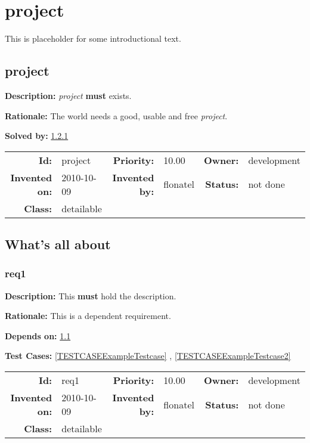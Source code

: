 \chapter{project}
This is placeholder for some introductional text.
\section{project}\label{project}
\textbf{Description:} \textsl{project} \textbf{must} exists.

\textbf{Rationale:} The world needs a good, usable and free \textsl{project}.

\textbf{Solved by:} \ref{req1} 

\par
{\small \begin{center}\begin{tabular}{rlrlrl}
\textbf{Id:} & project  & \textbf{Priority:} & 10.00  & \textbf{Owner:} & development\\ 
\textbf{Invented on:} & 2010-10-09  & \textbf{Invented by:} & flonatel  & \textbf{Status:} & not done \\ 
\textbf{Class:} & detailable  & & & \end{tabular}\end{center} }

\section{What's all about}
\subsection{req1}\label{req1}
\textbf{Description:} This \textbf{must} hold the description.

\textbf{Rationale:} This is a dependent requirement.

\textbf{Depends on:} \ref{project} 

\textbf{Test Cases:} \ref{TESTCASEExampleTestcase} , \ref{TESTCASEExampleTestcase2} 

\par
{\small \begin{center}\begin{tabular}{rlrlrl}
\textbf{Id:} & req1  & \textbf{Priority:} & 10.00  & \textbf{Owner:} & development\\ 
\textbf{Invented on:} & 2010-10-09  & \textbf{Invented by:} & flonatel  & \textbf{Status:} & not done \\ 
\textbf{Class:} & detailable  & & & \end{tabular}\end{center} }

